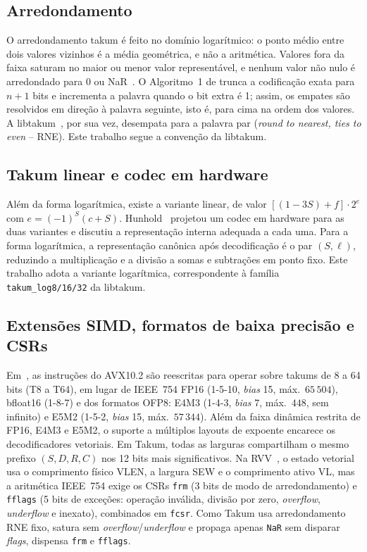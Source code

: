 \documentclass[journal]{IEEEtran}
\begin{document}
\subsection{Arredondamento}
O arredondamento takum é feito no domínio logarítmico: o ponto médio entre
dois valores vizinhos é a média geométrica, e não a aritmética. Valores fora
da faixa saturam no maior ou menor valor representável, e nenhum valor não
nulo é arredondado para 0 ou NaR~\cite{hunhold2024beating}. O Algoritmo~1 de
\cite{hunhold2024beating} trunca a codificação exata para $n+1$ bits e
incrementa a palavra quando o bit extra é 1; assim, os empates são
resolvidos em direção à palavra seguinte, isto é, para cima na ordem dos
valores. A libtakum~\cite{libtakum}, por sua vez, desempata para a
palavra par (\emph{round to nearest, ties to even} -- RNE). Este trabalho
segue a convenção da libtakum.

\subsection{Takum linear e codec em hardware}
Além da forma logarítmica, existe a variante linear, de valor
$[(1-3S)+f]\cdot 2^{e}$ com $e=(-1)^S(c+S)$. Hunhold~\cite{hunhold2024codec}
projetou um codec em hardware para as duas variantes e discutiu a
representação interna adequada a cada uma. Para a forma logarítmica, a
representação canônica após decodificação é o par $(S,\ell)$, reduzindo a
multiplicação e a divisão a somas e subtrações em ponto fixo. Este trabalho
adota a variante logarítmica, correspondente à família
\texttt{takum\_log8/16/32} da libtakum.

\subsection{Extensões SIMD, formatos de baixa precisão e CSRs}
Em~\cite{hunhold2025avx}, as instruções do AVX10.2 são reescritas para operar
sobre takums de 8 a 64 bits (T8 a T64), em lugar de IEEE~754 FP16 (1-5-10,
\emph{bias} 15, máx.\ $65\,504$), bfloat16 (1-8-7) e dos formatos OFP8: E4M3
(1-4-3, \emph{bias} 7, máx.\ $448$, sem infinito) e E5M2 (1-5-2, \emph{bias}
15, máx.\ $57\,344$). Além da faixa dinâmica restrita de FP16, E4M3 e E5M2, o
suporte a múltiplos layouts de expoente encarece os decodificadores vetoriais.
Em Takum, todas as larguras compartilham o mesmo prefixo $(S,D,R,C)$ nos 12
bits mais significativos. Na RVV~\cite{rvv}, o estado vetorial usa o
comprimento físico VLEN, a largura SEW e o comprimento ativo VL, mas a
aritmética IEEE~754 exige os CSRs \texttt{frm} (3 bits de modo de
arredondamento) e \texttt{fflags} (5 bits de exceções: operação inválida,
divisão por zero, \emph{overflow}, \emph{underflow} e inexato), combinados em
\texttt{fcsr}. Como Takum usa arredondamento RNE fixo, satura sem
\emph{overflow}/\emph{underflow} e propaga apenas \texttt{NaR} sem disparar
\emph{flags}, dispensa \texttt{frm} e \texttt{fflags}.
\end{document}
